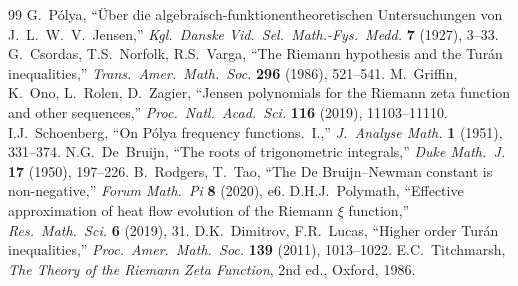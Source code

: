 \documentclass[11pt,a4paper]{article}
\theoremstyle{definition}
\theoremstyle{remark}
\begin{document}
\begin{thebibliography}{99}
 G.~P\'olya, ``\"Uber die algebraisch-funktionentheoretischen Untersuchungen von J.~L.~W.~V.~Jensen,'' \emph{Kgl.~Danske Vid.~Sel.~Math.-Fys.~Medd.} \textbf{7} (1927), 3--33.
 G.~Csordas, T.S.~Norfolk, R.S.~Varga, ``The Riemann hypothesis and the Tur\'an inequalities,'' \emph{Trans.~Amer.~Math.~Soc.} \textbf{296} (1986), 521--541.
 M.~Griffin, K.~Ono, L.~Rolen, D.~Zagier, ``Jensen polynomials for the Riemann zeta function and other sequences,'' \emph{Proc.~Natl.~Acad.~Sci.} \textbf{116} (2019), 11103--11110.
 I.J.~Schoenberg, ``On P\'olya frequency functions.~I.,'' \emph{J.~Analyse Math.} \textbf{1} (1951), 331--374.
 N.G.~De~Bruijn, ``The roots of trigonometric integrals,'' \emph{Duke Math.~J.} \textbf{17} (1950), 197--226.
 B.~Rodgers, T.~Tao, ``The De Bruijn--Newman constant is non-negative,'' \emph{Forum Math.~Pi} \textbf{8} (2020), e6.
 D.H.J.~Polymath, ``Effective approximation of heat flow evolution of the Riemann $\xi$ function,'' \emph{Res.~Math.~Sci.} \textbf{6} (2019), 31.
 D.K.~Dimitrov, F.R.~Lucas, ``Higher order Tur\'an inequalities,'' \emph{Proc.~Amer.~Math.~Soc.} \textbf{139} (2011), 1013--1022.
 E.C.~Titchmarsh, \emph{The Theory of the Riemann Zeta Function}, 2nd ed., Oxford, 1986.
\end{thebibliography}
\end{document}
